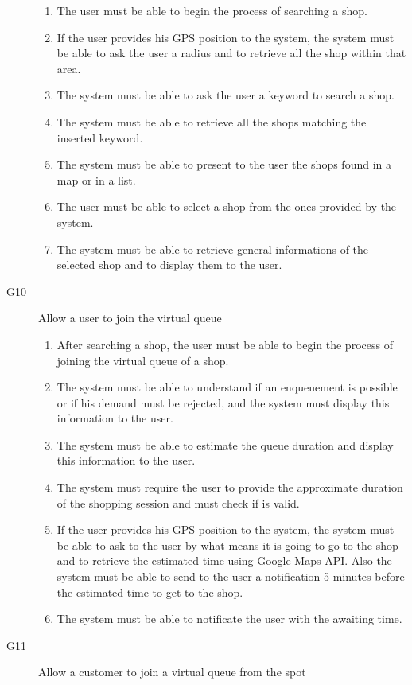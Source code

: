 \begin{description}
\begin{enumerate}[resume*]
            \item The user must be able to begin the process of searching a shop.
            \item If the user provides his GPS position to the system, the system must be able to ask the user a radius and to retrieve all the shop within that area.
            \item The system must be able to ask the user a keyword to search a shop.
            \item The system must be able to retrieve all the shops matching the inserted keyword.
            \item The system must be able to present to the user the shops found in a map or in a list.
            \item The user must be able to select a shop from the ones provided by the system.
            \item The system must be able to retrieve general informations of the selected shop and to display them to the user.
        \end{enumerate}
    \item [G10] Allow a user to join the virtual queue
        \begin{enumerate}[resume*]
            \item After searching a shop, the user must be able to begin the process of joining the virtual queue of a shop.
            \item The system must be able to understand if an enqueuement is possible or if his demand must be rejected, and the system must display this information to the user.
            \item The system must be able to estimate the queue duration and display this information to the user.
            \item The system must require the user to provide the approximate duration of the shopping session and must check if is valid.
            \item If the user provides his GPS position to the system, the system must be able to ask to the user by what means it is going to go to the shop and to retrieve the estimated time using Google Maps API. Also the system must be able to send to the user a notification 5 minutes before the estimated time to get to the shop.
            \item The system must be able to notificate the user with the awaiting time.
        \end{enumerate}
    \item [G11] Allow a customer to join a virtual queue from the spot

\end{description}
